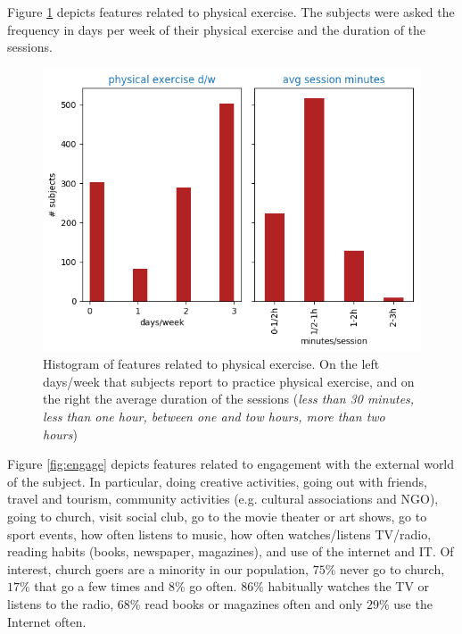 \documentclass[11pt]{article}
\theoremstyle{definition}
\theoremstyle{remark}
\begin{document}
Figure \ref{fig:phys} depicts features related to physical exercise. The subjects were asked the frequency in days per week of their physical exercise and the duration of the sessions.
\begin{figure}[H]
        \centering
        \includegraphics[keepaspectratio, width=0.6\linewidth]{figures/Fig_phys}
        \caption{Histogram of features related to physical exercise. On the left days/week that subjects report to practice physical exercise, and on the right the average duration of the sessions (\emph{less than 30 minutes, less than one hour, between one and tow hours, more than two hours})} 
        \label{fig:phys}
\end{figure}


Figure \ref{fig:engage} depicts features related to engagement with the external world of the subject. In particular, doing creative activities, going out with friends, travel and tourism, community activities (e.g. cultural associations and NGO), going to church, visit social club, go to the movie theater or art shows, go to sport events, how often listens to music, how often watches/listens TV/radio, reading habits (books, newspaper, magazines), and use of the internet and IT.
Of interest, church goers are a minority in our population, $75\%$ never go to church, $17\%$ that go a few times and $8\%$ go often. $86\%$ habitually watches the TV or listens to the radio, $68\%$ read books or magazines often and only $29\%$ use the Internet often.
\end{document}
